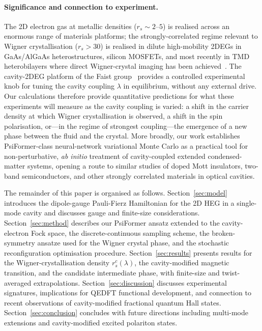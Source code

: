\paragraph*{Significance and connection to experiment.}
The 2D electron gas at metallic densities ($r_s \sim 2$--$5$) is
realised across an enormous range of materials platforms; the
strongly-correlated regime relevant to Wigner crystallisation
($r_s > 30$) is realised in dilute high-mobility 2DEGs in
GaAs/AlGaAs heterostructures, silicon MOSFETs, and most recently in
TMD heterobilayers where direct Wigner-crystal imaging has been
achieved~\cite{Smolenski2021,TsuiWigner2024}. The cavity-2DEG platform
of the Faist group~\cite{Bayer2017,LiX2018,ParaviciniBagliani2018,
Appugliese2022,Enkner2024} provides a controlled experimental knob for
tuning the cavity coupling $\lambda$ in equilibrium, without any
external drive. Our calculations therefore provide quantitative
predictions for what these experiments will measure as the cavity
coupling is varied: a shift in the carrier density at which Wigner
crystallisation is observed, a shift in the spin polarisation, or—in
the regime of strongest coupling—the emergence of a new phase between
the fluid and the crystal. More broadly, our work establishes
PsiFormer-class neural-network variational Monte Carlo as a practical
tool for non-perturbative, \emph{ab initio} treatment of cavity-coupled
extended condensed-matter systems, opening a route to similar studies
of doped Mott insulators, two-band semiconductors, and other strongly
correlated materials in optical cavities.

The remainder of this paper is organised as follows.
Section~\ref{sec:model} introduces the dipole-gauge Pauli-Fierz
Hamiltonian for the 2D HEG in a single-mode cavity and discusses
gauge and finite-size considerations.
Section~\ref{sec:method} describes our PsiFormer ansatz extended to
the cavity-electron Fock space, the discrete-continuous sampling
scheme, the broken-symmetry ansatze used for the Wigner crystal phase,
and the stochastic reconfiguration optimisation procedure.
Section~\ref{sec:results} presents results for the Wigner-crystallisation
density $r_s^c(\lambda)$, the cavity-modified magnetic transition, and
the candidate intermediate phase, with finite-size and twist-averaged
extrapolations.
Section~\ref{sec:discussion} discusses experimental signatures,
implications for QEDFT functional development, and connection to
recent observations of cavity-modified fractional quantum Hall states.
Section~\ref{sec:conclusion} concludes with future directions including
multi-mode extensions and cavity-modified excited polariton states.
